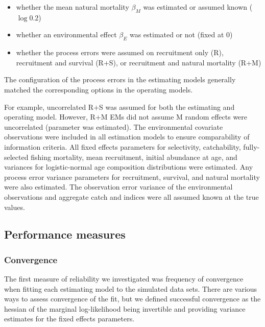 \documentclass[
  12pt,
]{article}
\begin{document}
\begin{itemize}
\item whether the mean natural mortality $\beta_M$ was estimated or assumed known ($\log 0.2$)
\item whether an environmental effect $\beta_E$ was estimated or not (fixed at 0)
\item whether the process errors were assumed on recruitment only (R), recruitment and survival (R+S), or recruitment and natural mortality (R+M)
\end{itemize}

The configuration of the process errors in the estimating models generally matched the corresponding options in the operating models.

For example, uncorrelated R+S was assumed for both the estimating and operating model. However, R+M EMs did not assume M random effects were uncorrelated (parameter was estimated). The environmental covariate observations were included in all estimation models to ensure comparability of information criteria. All fixed effects parameters for selectivity, catchability, fully-selected fishing mortality, mean recruitment, initial abundance at age, and variances for logistic-normal age composition distributions were estimated. Any process error variance parameters for recruitment, survival, and natural mortality were also estimated. The observation error variance of the environmental observations and aggregate catch and indices were all assumed known at the true values.

\hypertarget{performance-measures}{%
\subsection*{Performance measures}\label{performance-measures}}

\hypertarget{convergence}{%
\subsubsection*{Convergence}\label{convergence}}

The first measure of reliability we investigated was frequency of convergence when fitting each estimating model to the simulated data sets. There are various ways to assess convergence of the fit, but we defined successful convergence as the hessian of the marginal log-likelihood being invertible and providing variance estimates for the fixed effects parameters.
\end{document}
